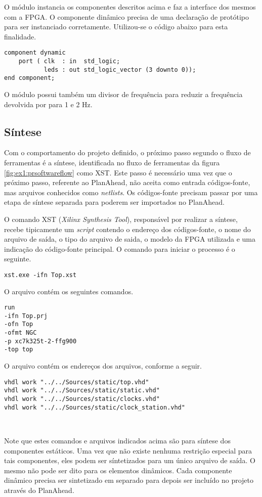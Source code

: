 \documentclass[11pt,a4paper,oneside]{book}
\begin{document}
O módulo  instancia os componentes descritos acima e faz a interface dos mesmos com a FPGA.
O componente dinâmico precisa de uma declaração de protótipo para ser instanciado corretamente.
Utilizou-se o código abaixo para esta finalidade.
\begin{lstlisting}[style=customVHDL]
component dynamic
    port ( clk  : in  std_logic;
           leds : out std_logic_vector (3 downto 0));
end component;
\end{lstlisting}
O módulo  possui também um divisor de frequência para reduzir a frequência devolvida por  para 1 e 2 Hz.

\subsection{Síntese}
Com o comportamento do projeto definido, o próximo passo segundo o fluxo de ferramentas é a síntese, identificada no fluxo de ferramentas da figura \ref{fig:ex1:prsoftwareflow} como XST.
Este passo é necessário uma vez que o próximo passo, referente ao PlanAhead, não aceita como entrada códigos-fonte, mas arquivos conhecidos como \textit{netlists}.
Os códigos-fonte precisam passar por uma etapa de síntese separada para poderem ser importados no PlanAhead.

O comando XST (\textit{Xilinx Synthesis Tool}), responsável por realizar a síntese, recebe tipicamente um \textit{script} contendo o endereço dos códigos-fonte, o nome do arquivo de saída, o tipo do arquivo de saida, o modelo da FPGA utilizada e uma indicação do código-fonte principal.
O comando para iniciar o processo é o seguinte.
\begin{lstlisting}[style=customVHDL]
xst.exe -ifn Top.xst
\end{lstlisting}
O arquivo  contém os seguintes comandos.
\begin{lstlisting}[style=customVHDL]
run
-ifn Top.prj
-ofn Top
-ofmt NGC
-p xc7k325t-2-ffg900
-top top
\end{lstlisting}
O arquivo  contém os endereços dos arquivos, conforme a seguir.
\begin{lstlisting}[style=customVHDL]
vhdl work "../../Sources/static/top.vhd"
vhdl work "../../Sources/static/static.vhd"
vhdl work "../../Sources/static/clocks.vhd"
vhdl work "../../Sources/static/clock_station.vhd"
\end{lstlisting}\

Note que estes comandos e arquivos indicados acima são para síntese dos componentes estáticos.
Uma vez que não existe nenhuma restrição especial para tais componentes, eles podem ser síntetizados para um único arquivo de saída.
O mesmo não pode ser dito para os elementos dinâmicos.
Cada componente dinâmico precisa ser sintetizado em separado para depois ser incluído no projeto através do PlanAhead.
\end{document}
